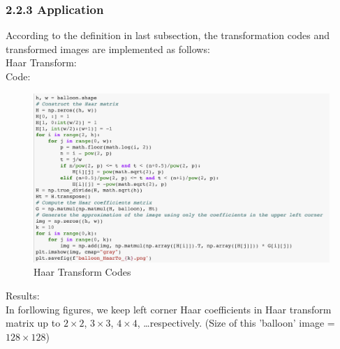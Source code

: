 \documentclass[12pt]{article}
\begin{document}
\subsubsection*{2.2.3 \quad Application}
According to the definition in last subsection, the transformation codes and transformed images are implemented as follows:\\
Haar Transform:\\
Code:
\begin{figure}[H]
    \centering
    \includegraphics[width=1\textwidth]{haar_code.png}
    \caption{Haar Transform Codes}
\end{figure}
\begin{flushleft}
Results:\\
In forllowing figures, we keep left corner Haar coefficients in Haar transform matrix up to  $2 \times 2$, 
$3 \times 3$, $4 \times 4$, \dots respectively.
(Size of this 'balloon' image = $128 \times 128$)
\end{flushleft}
\end{document}
